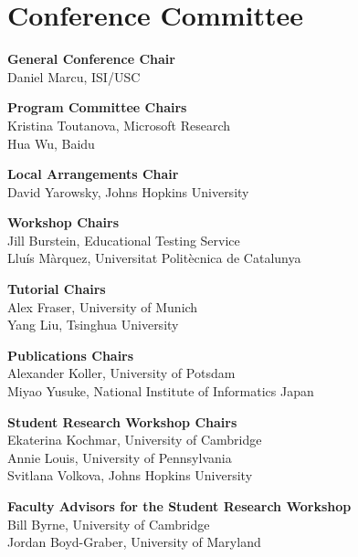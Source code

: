 \markboth{}{} %
\markright{}{} %

\section{Conference Committee}{}

\setlength{\parindent}{0pt}

{\bf General Conference Chair} \\
Daniel Marcu, ISI/USC \\

{\bf Program Committee Chairs} \\
Kristina Toutanova, Microsoft Research \\
Hua Wu, Baidu \\

{\bf Local Arrangements Chair} \\
David Yarowsky, Johns Hopkins University \\

{\bf Workshop Chairs} \\
Jill Burstein, Educational Testing Service \\
Lluís Màrquez, Universitat Politècnica de Catalunya \\

{\bf Tutorial Chairs} \\
Alex Fraser, University of Munich \\
Yang Liu, Tsinghua University \\

{\bf Publications Chairs} \\
Alexander Koller, University of Potsdam \\
Miyao Yusuke, National Institute of Informatics Japan \\

{\bf Student Research Workshop Chairs} \\
Ekaterina Kochmar, University of Cambridge \\
Annie Louis, University of Pennsylvania \\
Svitlana Volkova, Johns Hopkins University \\

{\bf Faculty Advisors for the Student Research Workshop} \\
Bill Byrne, University of Cambridge \\
Jordan Boyd-Graber, University of Maryland \\

